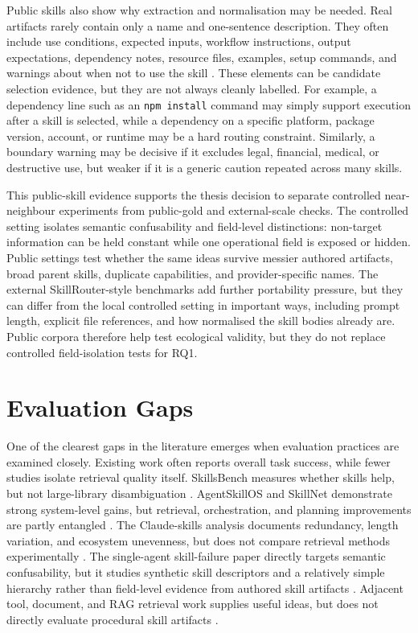 Public skills also show why extraction and normalisation may be needed. Real artifacts rarely contain only a name and one-sentence description. They often include use conditions, expected inputs, workflow instructions, output expectations, dependency notes, resource files, examples, setup commands, and warnings about when not to use the skill \cite{anthropic2025skills,ling2026claudeskills}. These elements can be candidate selection evidence, but they are not always cleanly labelled. For example, a dependency line such as an \texttt{npm install} command may simply support execution after a skill is selected, while a dependency on a specific platform, package version, account, or runtime may be a hard routing constraint. Similarly, a boundary warning may be decisive if it excludes legal, financial, medical, or destructive use, but weaker if it is a generic caution repeated across many skills.

This public-skill evidence supports the thesis decision to separate controlled near-neighbour experiments from public-gold and external-scale checks. The controlled setting isolates semantic confusability and field-level distinctions: non-target information can be held constant while one operational field is exposed or hidden. Public settings test whether the same ideas survive messier authored artifacts, broad parent skills, duplicate capabilities, and provider-specific names. The external SkillRouter-style benchmarks add further portability pressure, but they can differ from the local controlled setting in important ways, including prompt length, explicit file references, and how normalised the skill bodies already are. Public corpora therefore help test ecological validity, but they do not replace controlled field-isolation tests for RQ1.

\section{Evaluation Gaps}

One of the clearest gaps in the literature emerges when evaluation practices are examined closely. Existing work often reports overall task success, while fewer studies isolate retrieval quality itself. SkillsBench measures whether skills help, but not large-library disambiguation \cite{li2026skillsbench}. AgentSkillOS and SkillNet demonstrate strong system-level gains, but retrieval, orchestration, and planning improvements are partly entangled \cite{li2026agentskillos,liang2026skillnet}. The Claude-skills analysis documents redundancy, length variation, and ecosystem unevenness, but does not compare retrieval methods experimentally \cite{ling2026claudeskills}. The single-agent skill-failure paper directly targets semantic confusability, but it studies synthetic skill descriptors and a relatively simple hierarchy rather than field-level evidence from authored skill artifacts \cite{li2026singleagent}. Adjacent tool, document, and RAG retrieval work supplies useful ideas, but does not directly evaluate procedural skill artifacts \cite{sarthi2024raptor,zhuang2024toolchain,ding2025scitoolagent,zhu2025kg2rag,zheng2024toolrerank,shi2025toolret}.

